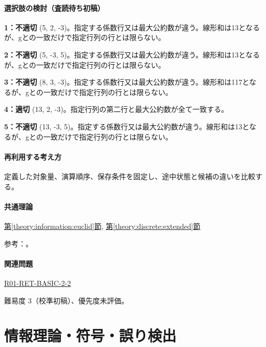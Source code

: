 \paragraph{選択肢の検討（査読待ち初稿）}\mbox{}\par

\noindent\textbf{1：不適切} (5, 2, -3)。指定する係数行又は最大公約数が違う。線形和は13となるが、gとの一致だけで指定行列の行とは限らない。\par

\noindent\textbf{2：不適切} (5, -3, 5)。指定する係数行又は最大公約数が違う。線形和は13となるが、gとの一致だけで指定行列の行とは限らない。\par

\noindent\textbf{3：不適切} (8, 3, -3)。指定する係数行又は最大公約数が違う。線形和は117となるが、gとの一致だけで指定行列の行とは限らない。\par

\noindent\textbf{4：適切} (13, 2, -3)。指定行列の第二行と最大公約数が全て一致する。\par

\noindent\textbf{5：不適切} (13, -3, 5)。指定する係数行又は最大公約数が違う。線形和は13となるが、gとの一致だけで指定行列の行とは限らない。\par

\paragraph{再利用する考え方} 定義した対象量、演算順序、保存条件を固定し、途中状態と候補の違いを比較する。

\paragraph{共通理論} \hyperref[theory:information:euclid]{第\ref*{theory:information:euclid}節}, \hyperref[theory:discrete:extended]{第\ref*{theory:discrete:extended}節}

\par 参考：\cite{mit_discrete2015}。

\paragraph{関連問題} \hyperref[q:r01-ret-basic-2-2]{R01-RET-BASIC-2-2}

\par 難易度 3（校準初稿）、優先度未評価。

\section{情報理論・符号・誤り検出}

